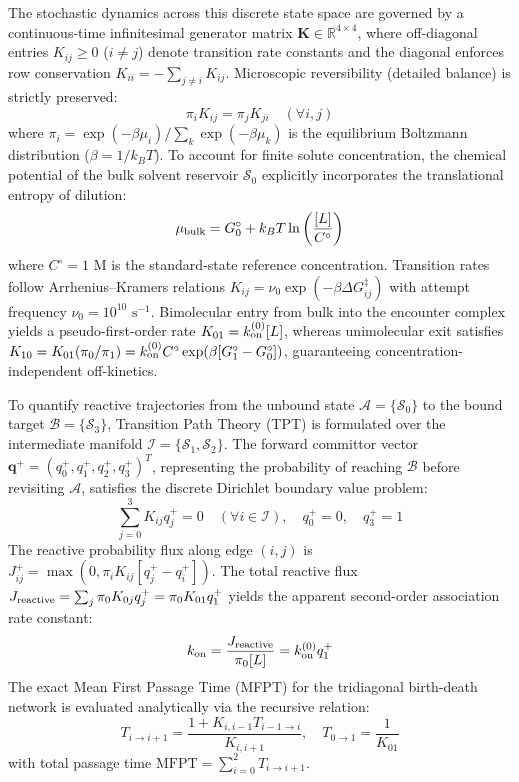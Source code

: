 \documentclass[journal=jpcbfk,manuscript=article]{achemso}
\begin{document}
The stochastic dynamics across this discrete state space are governed by a continuous-time infinitesimal generator matrix $\mathbf{K} \in \mathbb{R}^{4 \times 4}$, where off-diagonal entries $K_{ij} \ge 0$ ($i \neq j$) denote transition rate constants and the diagonal enforces row conservation $K_{ii} = -\sum_{j \neq i} K_{ij}$. Microscopic reversibility (detailed balance) is strictly preserved:\cite{noe2009constructing}
\begin{equation}
\pi_i K_{ij} = \pi_j K_{ji} \quad (\forall i, j)
\end{equation}
where $\pi_i = \exp(-\beta \mu_i) / \sum_k \exp(-\beta \mu_k)$ is the equilibrium Boltzmann distribution ($\beta = 1/k_B T$). To account for finite solute concentration, the chemical potential of the bulk solvent reservoir $\mathcal{S}_0$ explicitly incorporates the translational entropy of dilution:
\begin{equation}
\mu_{\rm bulk} = G_0^\circ + k_B T \ln\left( \frac{[L]}{C^\circ} \right)
\end{equation}
where $C^\circ = 1\text{ M}$ is the standard-state reference concentration. Transition rates follow Arrhenius--Kramers relations $K_{ij} = \nu_0 \exp(-\beta \Delta G_{ij}^\ddagger)$ with attempt frequency $\nu_0 = 10^{10}\text{ s}^{-1}$. Bimolecular entry from bulk into the encounter complex yields a pseudo-first-order rate $K_{01} = k_{\rm on}^{(0)} [L]$, whereas unimolecular exit satisfies $K_{10} = K_{01} (\pi_0 / \pi_1) = k_{\rm on}^{(0)} C^\circ \exp(\beta [G_1^\circ - G_0^\circ])$, guaranteeing concentration-independent off-kinetics.

To quantify reactive trajectories from the unbound state $\mathcal{A} = \{\mathcal{S}_0\}$ to the bound target $\mathcal{B} = \{\mathcal{S}_3\}$, Transition Path Theory (TPT) is formulated over the intermediate manifold $\mathcal{I} = \{\mathcal{S}_1, \mathcal{S}_2\}$.\cite{vanden2006transition} The forward committor vector $\mathbf{q}^+ = (q_0^+, q_1^+, q_2^+, q_3^+)^T$, representing the probability of reaching $\mathcal{B}$ before revisiting $\mathcal{A}$, satisfies the discrete Dirichlet boundary value problem:
\begin{equation}
\sum_{j=0}^3 K_{ij} q_j^+ = 0 \quad (\forall i \in \mathcal{I}), \quad q_0^+ = 0, \quad q_3^+ = 1
\end{equation}
The reactive probability flux along edge $(i, j)$ is $J_{ij}^+ = \max(0, \pi_i K_{ij} [q_j^+ - q_i^+])$. The total reactive flux $J_{\rm reactive} = \sum_{j} \pi_0 K_{0j} q_j^+ = \pi_0 K_{01} q_1^+$ yields the apparent second-order association rate constant:
\begin{equation}
k_{\rm on} = \frac{J_{\rm reactive}}{\pi_0 [L]} = k_{\rm on}^{(0)} q_1^+
\end{equation}
The exact Mean First Passage Time (MFPT) for the tridiagonal birth-death network is evaluated analytically via the recursive relation:
\begin{equation}
T_{i \to i+1} = \frac{1 + K_{i, i-1} T_{i-1 \to i}}{K_{i, i+1}}, \quad T_{0 \to 1} = \frac{1}{K_{01}}
\end{equation}
with total passage time $\text{MFPT} = \sum_{i=0}^2 T_{i \to i+1}$.
\end{document}
